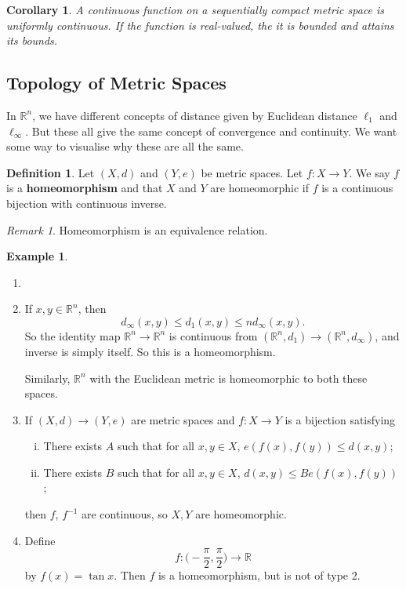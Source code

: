 \documentclass[12pt]{article}
\newtheorem{corollary}{Corollary}[section]
\theoremstyle{definition}
\newtheorem{definition}{Definition}[section]
\newtheorem{example}{Example}[section]
\theoremstyle{remark}
\newtheorem*{remark}{Remark}
\begin{document}
\begin{corollary}
	A continuous function on a sequentially compact metric space is uniformly continuous. If the function is real-valued, the it is bounded and attains its bounds.
\end{corollary}

\subsection{Topology of Metric Spaces}%
\label{sub:topology_of_metric_spaces}

In $\mathbb{R}^{n}$, we have different concepts of distance given by Euclidean distance $\ell_1$ and $\ell_{\infty}$. But these all give the same concept of convergence and continuity. We want some way to visualise why these are all the same.

\begin{definition}
	Let $(X, d)$ and $(Y, e)$ be metric spaces. Let $f : X \to Y$. We say $f$ is a \textbf{homeomorphism} and that $X$ and $Y$ are homeomorphic if $f$ is a continuous bijection with continuous inverse.
\end{definition}

\begin{remark}
	Homeomorphism is an equivalence relation.
\end{remark}

\begin{adjustbox}{minipage = \columnwidth - 25.5pt, margin=1em, frame=1pt, margin=0em}
\begin{example}
	\begin{enumerate}[1.]
		\item[]
		\item If $x, y \in \mathbb{R}^{n}$, then
			\[
				d_{\infty}(x, y) \leq d_1(x, y) \leq n d_{\infty}(x, y)
			.\]
			So the identity map $\mathbb{R}^{n} \to \mathbb{R}^{n}$ is continuous from $(\mathbb{R}^{n}, d_1 ) \to (\mathbb{R}^{n}, d_{\infty})$, and inverse is simply itself. So this is a homeomorphism.

			Similarly, $\mathbb{R}^{n}$ with the Euclidean metric is homeomorphic to both these spaces.
		\item If $(X, d) \to (Y, e)$ are metric spaces and $f : X \to Y$ is a bijection satisfying
			\begin{enumerate}[(i)]
				\item There exists $A$ such that for all $x, y \in X$, $e(f(x), f(y)) \leq d(x, y)$;
				\item There exists $B$ such that for all $x, y \in X$, $d(x, y) \leq Be(f(x), f(y))$;
			\end{enumerate}
			then $f$, $f^{-1}$ are continuous, so $X, Y$ are homeomorphic.
		\item Define
			\[
				f : \biggl( - \frac{\pi}{2} , \frac{\pi}{2} \biggr) \to \mathbb{R}
			\]
			by $f(x) = \tan x$. Then $f$ is a homeomorphism, but is not of type 2.
	\end{enumerate}
\end{example}

\end{adjustbox}
\end{document}
